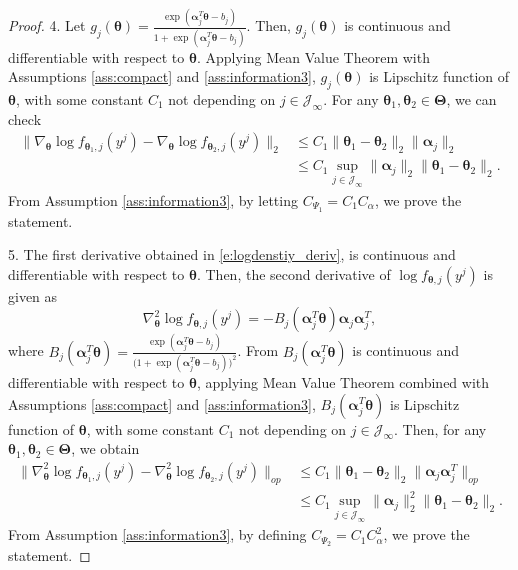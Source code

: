 \documentclass[10pt,a4paper]{amsart}
\newcommand{\bfTheta}{\boldsymbol{\Theta}}
\newcommand{\bfalpha}{\boldsymbol{\alpha}}
\newcommand{\bftheta}{\boldsymbol{\theta}}
\begin{document}
\begin{proof}
4. Let $g_j(\bftheta) = \frac{\exp(\bfalpha_j^T \bftheta - b_j)}{1 + \exp(\bfalpha_j^T \bftheta - b_j)}$. 
Then, $g_j(\bftheta)$ is continuous and differentiable with respect to $\bftheta$. Applying Mean Value Theorem with Assumptions \ref{ass:compact} and \ref{ass:information3}, $g_j(\bftheta)$ is Lipschitz function of $\bftheta$, with some constant $C_1$ not depending on $j \in \mathcal{J}_{\infty}$. For any $\bftheta_1, \bftheta_2 \in \bfTheta$, we can check
\begin{align*}
\| \nabla_{\bftheta} \log f_{\bftheta_1, j}(y^j) - \nabla_{\bftheta} \log f_{\bftheta_2, j}(y^j) \|_2 
&\leq C_1 \|\bftheta_1 - \bftheta_2 \|_2 \| \bfalpha_j \|_2
\\ &\le C_1 \sup_{j \in \mathcal{J}_{\infty}} \| \bfalpha_j \|_2 \|\bftheta_1 - \bftheta_2 \|_2.
\end{align*}
From Assumption \ref{ass:information3}, by letting $C_{\Psi_1} = C_1 C_{\alpha}$, we prove the statement.


5. The first derivative obtained in \eqref{e:logdenstiy_deriv}, is continuous and differentiable with respect to $\bftheta$. Then, the second derivative of $\log f_{\bftheta, j}(y^j)$ is given as
\begin{equation} \label{e:logdensity_deriv2}
\nabla_{\bftheta}^2 \log f_{\bftheta, j}(y^j) = - B_j( \bfalpha_j^T \bftheta) \bfalpha_j \bfalpha_j^T,
\end{equation}
where $B_j(\bfalpha_j^T \bftheta) = \frac{\exp(\bfalpha_j^T \bftheta - b_j)}{\bigl(1+\exp(\bfalpha_j^T \bftheta - b_j) \bigr)^2}$. From $B_j(\bfalpha_j^T \bftheta)$ is continuous and differentiable with respect to $\bftheta$, applying Mean Value Theorem combined with Assumptions \ref{ass:compact} and \ref{ass:information3}, $B_j(\bfalpha_j^T \bftheta)$ is Lipschitz function of $\bftheta$, with some constant $C_1$ not depending on $j \in \mathcal{J}_{\infty}$. Then, for any $\bftheta_1, \bftheta_2 \in \bfTheta$, we obtain
\begin{align*}
\| \nabla_{\bftheta}^2 \log f_{\bftheta_1, j}(y^j) - \nabla_{\bftheta}^2 \log f_{\bftheta_2, j}(y^j) \|_{op} &\leq C_1 \| \bftheta_1 - \bftheta_2 \|_2 \| \bfalpha_j \bfalpha_j^T \|_{op}
\\ &\le C_1 \sup_{j \in \mathcal{J}_{\infty}} \| \bfalpha_j \|_2^2 \| \bftheta_1 - \bftheta_2 \|_2.
\end{align*}
From Assumption \ref{ass:information3}, by defining $C_{\Psi_2} = C_1 C_{\alpha}^2$, we prove the statement.


\end{proof}
\end{document}
